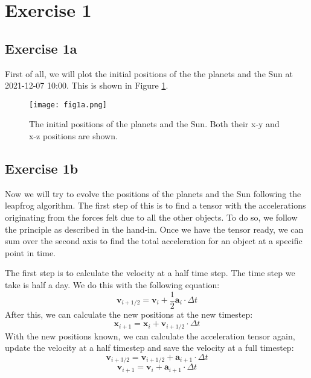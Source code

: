 \section{Exercise 1}
\subsection{Exercise 1a}

First of all, we will plot the initial positions of the the planets and the Sun at 2021-12-07 10:00. This is shown in Figure \ref{fig:1a}. 

\begin{figure}[h!]
  \centering
  \texttt{[image: fig1a.png]}
  \caption{The initial positions of the planets and the Sun. Both their x-y and x-z positions are shown. }
  \label{fig:1a}
\end{figure}

\subsection{Exercise 1b}
Now we will try to evolve the positions of the planets and the Sun following the leapfrog algorithm. The first step of this is to find a tensor with the accelerations originating from the forces felt due to all the other objects. To do so, we follow the principle as described in the hand-in. Once we have the tensor ready, we can sum over the second axis to find the total acceleration for an object at a specific point in time. 

The first step is to calculate the velocity at a half time step. The time step we take is half a day. We do this with the following equation: 
\begin{equation}
    \mathbf{v}_{i+1/2} = \mathbf{v}_i + \frac{1}{2}\mathbf{a}_i \cdot \Delta t
\end{equation}
After this, we can calculate the new positions at the new timestep: 
\begin{equation}
    \mathbf{x}_{i+1} = \mathbf{x}_i + \mathbf{v}_{i+1/2} \cdot \Delta t
\end{equation}
With the new positions known, we can calculate the acceleration tensor again, update the velocity at a half timestep and save the velocity at a full timestep: 
\begin{equation}
    \mathbf{v}_{i+3/2} = \mathbf{v}_{i+1/2} + \mathbf{a}_{i+1} \cdot \Delta t
\end{equation}
\begin{equation}
    \mathbf{v}_{i+1} = \mathbf{v}_i + \mathbf{a}_{i+1} \cdot \Delta t
\end{equation}

